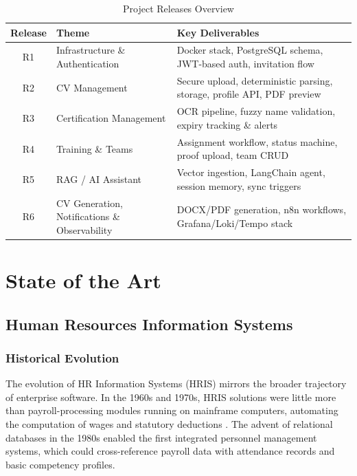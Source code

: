 \documentclass[12pt,a4paper,oneside,openany]{report}
\begin{document}
\begin{table}[H]
\centering
\caption{Project Releases Overview}
\label{tab:releases}
\begin{tabularx}{\textwidth}{@{}c l X@{}}
\toprule
\textbf{Release} & \textbf{Theme} & \textbf{Key Deliverables} \\
\midrule
R1 & Infrastructure \& Authentication & Docker stack, PostgreSQL schema, JWT-based auth, invitation flow \\
R2 & CV Management & Secure upload, deterministic parsing, storage, profile API, PDF preview \\
R3 & Certification Management & OCR pipeline, fuzzy name validation, expiry tracking \& alerts \\
R4 & Training \& Teams & Assignment workflow, status machine, proof upload, team CRUD \\
R5 & RAG / AI Assistant & Vector ingestion, LangChain agent, session memory, sync triggers \\
R6 & CV Generation, Notifications \& Observability & DOCX/PDF generation, n8n workflows, Grafana/Loki/Tempo stack \\
\bottomrule
\end{tabularx}
\end{table}

\chapter{State of the Art}
\label{chap:state_of_art}

\section{Human Resources Information Systems}

\subsection{Historical Evolution}
The evolution of \ac{HR} Information Systems (\acs{HR}IS) mirrors the broader trajectory of enterprise software. In the 1960s and 1970s, \acs{HR}IS solutions were little more than payroll-processing modules running on mainframe computers, automating the computation of wages and statutory deductions \cite{kavanagh2017human}. The advent of relational databases in the 1980s enabled the first integrated personnel management systems, which could cross-reference payroll data with attendance records and basic competency profiles.
\end{document}
